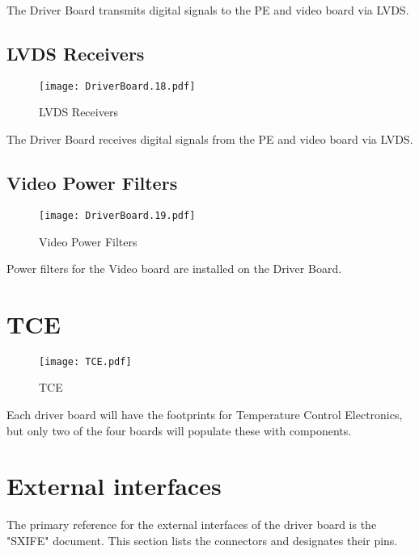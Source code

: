 \documentclass[a4paper,12pt]{article}
\begin{document}
The Driver Board transmits digital signals to the PE and video board via LVDS.

\subsection{LVDS Receivers}
   \begin{figure}
   \begin{center}
   \texttt{[image: DriverBoard.18.pdf]}
   \end{center}
   \caption{LVDS Receivers}
   \end{figure}

The Driver Board receives digital signals from the PE and video board via LVDS.


\subsection{Video Power Filters}
   \begin{figure}
   \begin{center}
   \texttt{[image: DriverBoard.19.pdf]}
   \end{center}
   \caption{Video Power Filters}
   \end{figure}

Power filters for the Video board are installed on the Driver Board.

\section{TCE}

   \begin{figure}
   \begin{center}
   \texttt{[image: TCE.pdf]}
   \end{center}
   \caption{TCE}
   \end{figure}


Each driver board will have the footprints for Temperature Control Electronics, but only two of the four boards will populate these with components.

\section{External interfaces}

The primary reference for the external interfaces of the driver board is the "SXIFE" document. This section lists the connectors and designates their pins.
\end{document}
